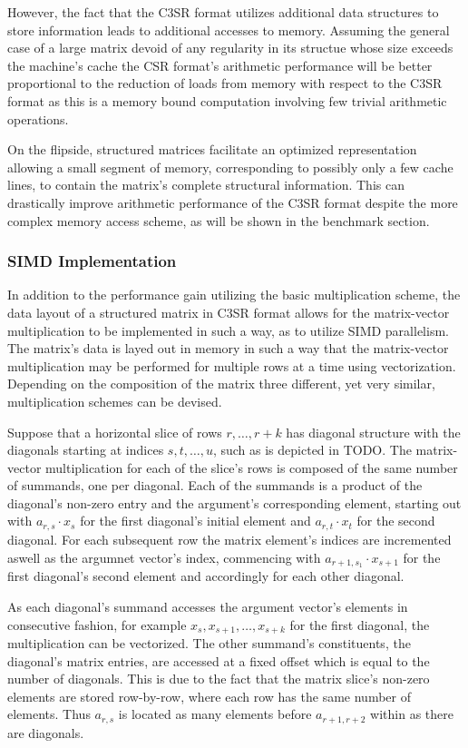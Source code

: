 \documentclass{article}
\begin{document}
      However, the fact that the C3SR format utilizes additional data structures to store information leads to additional accesses to memory. Assuming the general case of a large matrix devoid of any regularity in its structue whose size exceeds the machine's cache the CSR format's arithmetic performance will be better proportional to the reduction of loads from memory with respect to the C3SR format as this is a memory bound computation involving few trivial arithmetic operations.

      On the flipside, structured matrices facilitate an optimized representation allowing a small segment of memory, corresponding to possibly only a few cache lines, to contain the matrix's complete structural information. This can drastically improve arithmetic performance of the C3SR format despite the more complex memory access scheme, as will be shown in the benchmark section.

    \subsubsection{SIMD Implementation}

      In addition to the performance gain utilizing the basic multiplication scheme, the data layout of a structured matrix in C3SR format allows for the matrix-vector multiplication to be implemented in such a way, as to utilize SIMD parallelism. The matrix's data is layed out in memory in such a way that the matrix-vector multiplication may be performed for multiple rows at a time using vectorization. Depending on the composition of the matrix three different, yet very similar, multiplication schemes can be devised.

      Suppose that a horizontal slice of rows $r, \ldots, r+k$ has diagonal structure with the diagonals starting at indices $s, t, \ldots, u$, such as is depicted in TODO. The matrix-vector multiplication for each of the slice's rows is composed of the same number of summands, one per diagonal. Each of the summands is a product of the diagonal's non-zero entry and the argument's corresponding element, starting out with $a_{r,s} \cdot x_s$ for the first diagonal's initial element and $a_{r,t} \cdot x_t$ for the second diagonal. For each subsequent row the matrix element's indices are incremented aswell as the argumnet vector's index, commencing with $a_{r+1, s_1} \cdot x_{s+1}$ for the first diagonal's second element and accordingly for each other diagonal.

      As each diagonal's summand accesses the argument vector's elements in consecutive fashion, for example $x_s, x_{s+1}, \ldots, x_{s + k}$ for the first diagonal, the multiplication can be vectorized. The other summand's constituents, the diagonal's matrix entries, are accessed at a fixed offset which is equal to the number of diagonals. This is due to the fact that the matrix slice's non-zero elements are stored row-by-row, where each row has the same number of elements. Thus $a_{r,s}$ is located as many elements before $a_{r+1, r+2}$ within \V as there are diagonals. 
\end{document}
